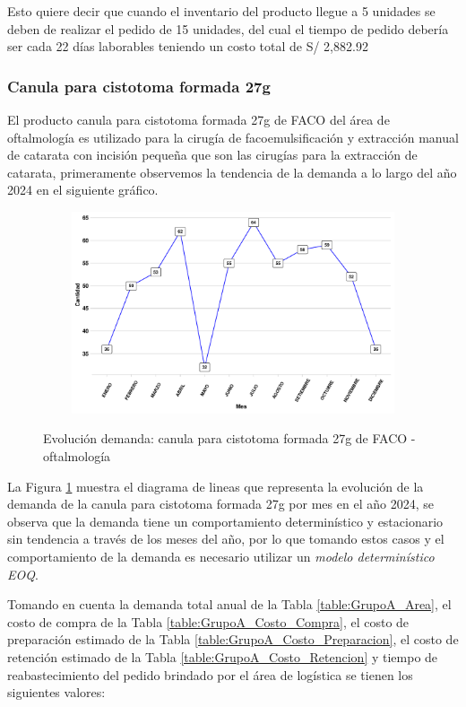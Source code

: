 Esto quiere decir que cuando el inventario del producto llegue a 5 unidades se deben de realizar el pedido de 15 unidades, del cual el tiempo de pedido debería ser cada 22 días laborables teniendo un costo total de S/ 2,882.92
\subsubsection{Canula para cistotoma formada 27g}

El producto canula para cistotoma formada 27g de FACO del área de oftalmología es utilizado para la cirugía de facoemulsificación y extracción manual de catarata con incisión pequeña que son las cirugías para la extracción de catarata, primeramente observemos la tendencia de la demanda a lo largo del año 2024 en el siguiente gráfico.

\begin{figure}[H]
  \caption{Evolución demanda: canula para cistotoma formada 27g de FACO - oftalmología}
  {\includegraphics[width=15cm, height=5.95cm]{images/PROD009_demanda.pdf}}
  \label{fig:PROD009_demanda}
\end{figure}

La Figura \ref{fig:PROD009_demanda} muestra el diagrama de lineas que representa la evolución de la demanda de la canula para cistotoma formada 27g por mes en el año 2024, se observa que la demanda tiene un comportamiento determinístico y estacionario sin tendencia a través de los meses del año, por lo que tomando estos casos y el comportamiento de la demanda es necesario utilizar un \textsl{modelo determinístico EOQ}.

Tomando en cuenta la demanda total anual de la Tabla \ref{table:GrupoA_Area}, el costo de compra de la Tabla \ref{table:GrupoA_Costo_Compra}, el costo de preparación estimado de la Tabla \ref{table:GrupoA_Costo_Preparacion}, el costo de retención estimado de la Tabla \ref{table:GrupoA_Costo_Retencion} y tiempo de reabastecimiento del pedido brindado por el área de logística se tienen los siguientes valores:

